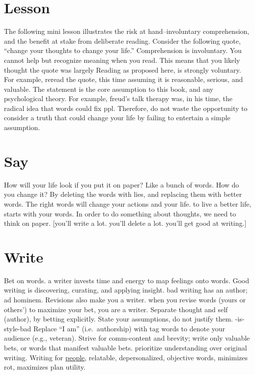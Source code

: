 \documentclass[
]{book}
\begin{document}
\section{Lesson}\label{lesson}

The following mini lesson illustrates the risk at hand--involuntary comprehension, and the benefit at stake from deliberate reading.
Consider the following quote, ``change your thoughts to change your life.''
Comprehension is involuntary.
You cannot help but recognize meaning when you read.
This means that you likely thought the quote was largely
Reading as proposed here, is strongly voluntary.
For example, reread the quote, this time assuming it is reasonable, serious, and valuable.
The statement is the core assumption to this book, and any psychological theory.
For example, freud's talk therapy was, in his time, the radical idea that words could fix ppl.
Therefore, do not waste the opportunity to consider a truth that could change your life by failing to entertain a simple assumption.

\section{Say}\label{say}

How will your life look if you put it on paper? Like a bunch of words.
How do you change it? By deleting the words with lies, and replacing them with better words.
The right words will change your actions and your life. to live a better life, starts with your words.
In order to do something about thoughts, we need to think on paper. {[}you'll write a lot. you'll delete a lot. you'll get good at writing.{]}

\section{Write}\label{write}

Bet on words. a writer invests time and energy to map feelings onto words.
Good writing is discovering, curating, and applying insight. bad writing has an author; ad hominem.
Revisions also make you a writer. when you revise words (yours or others') to maximize your bet, you are a writer.
Separate thought and self (author), by betting explicitly.
State your assumptions, do not justify them. -is-style-bad
Replace ``I am'' (i.e.~authorship) with tag words to denote your audience (e.g., veteran).
Strive for comm-content and brevity; write only valuable bets, or words that manifest valuable bets. prioritize understanding over original writing.
Writing for \hyperref[library]{people}, relatable, depersonalized, objective words, minimizes rot, maximizes plan utility.
\end{document}
